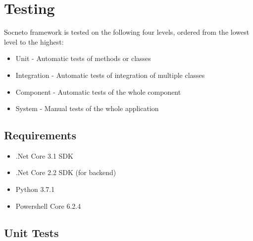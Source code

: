 \chapter{Testing}\label{chapter:testing}

Socneto framework is tested on the following four levels, ordered from the lowest level to the highest:

\begin{itemize}
    \item Unit - Automatic tests of methods or classes
    \item Integration - Automatic tests of integration of multiple classes
    \item Component - Automatic tests of the whole component
    \item System - Manual tests of the whole application
\end{itemize}

\section{Requirements}

\begin{itemize}
    \item .Net Core 3.1 SDK
    \item .Net Core 2.2 SDK (for backend)
    \item Python 3.7.1
    \item Powershell Core 6.2.4
\end{itemize}


\section{Unit Tests}

